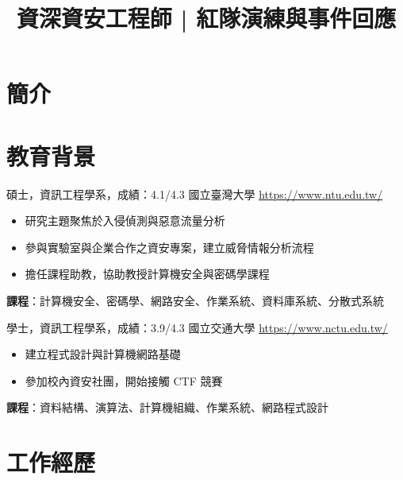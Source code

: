 \documentclass[a4paper, serif, 10pt]{moderncv}
\title{資深資安工程師 | 紅隊演練與事件回應}
\begin{document}
\maketitle

\section{簡介}

\section{教育背景}

        {碩士，資訊工程學系，成績：4.1/4.3}
        {國立臺灣大學}
        {\url{https://www.ntu.edu.tw/}}
        {}
        {\begin{itemize}
\item 研究主題聚焦於入侵偵測與惡意流量分析
\item 參與實驗室與企業合作之資安專案，建立威脅情報分析流程
\item 擔任課程助教，協助教授計算機安全與密碼學課程
\end{itemize}
\textbf{課程}：計算機安全、密碼學、網路安全、作業系統、資料庫系統、分散式系統}

        {學士，資訊工程學系，成績：3.9/4.3}
        {國立交通大學}
        {\url{https://www.nctu.edu.tw/}}
        {}
        {\begin{itemize}
\item 建立程式設計與計算機網路基礎
\item 參加校內資安社團，開始接觸 CTF 競賽
\end{itemize}
\textbf{課程}：資料結構、演算法、計算機組織、作業系統、網路程式設計}
\section{工作經歷}
\end{document}
